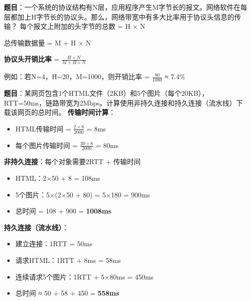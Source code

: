 \begin{examplebox}
\textbf{题目}：一个系统的协议结构有N层，应用程序产生M字节长的报文。网络软件在每层都加上H字节长的协议头。那么，网络带宽中有多大比率用于协议头信息的传输？
\tcblower
每个报文上附加的头字节的总数 = H × N

总传输数据量 = M + H × N

\textbf{协议头开销比率} = $\frac{H \times N}{M + H \times N}$

例如：若N=4，H=20，M=1000，则开销比率 = $\frac{80}{1080}$ ≈ 7.4\%
\end{examplebox}

\begin{examplebox}
\textbf{题目}：某网页包含1个HTML文件（2KB）和5个图片（每个20KB），RTT=50ms，链路带宽为2Mbps。计算使用非持久连接和持久连接（流水线）下载该网页的总时间。
\tcblower
\textbf{传输时间计算}：
\begin{itemize}[itemsep=0pt]
    \item HTML传输时间 = $\frac{2\times8}{2000}$ = 8ms
    \item 每个图片传输时间 = $\frac{20\times8}{2000}$ = 80ms
\end{itemize}

\textbf{非持久连接}：每个对象需要2RTT + 传输时间
\begin{itemize}[itemsep=0pt]
    \item HTML：2×50 + 8 = 108ms
    \item 5个图片：5×(2×50 + 80) = 5×180 = 900ms
    \item 总时间 = 108 + 900 = \textbf{1008ms}
\end{itemize}

\textbf{持久连接（流水线）}：
\begin{itemize}[itemsep=0pt]
    \item 建立连接：1RTT = 50ms
    \item 请求HTML：1RTT + 8ms = 58ms
    \item 连续请求5个图片：1RTT + 5×80ms = 450ms
    \item 总时间 ≈ 50 + 58 + 450 = \textbf{558ms}
\end{itemize}
\end{examplebox}

